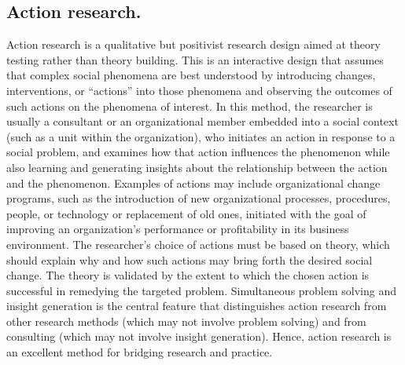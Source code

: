 \subsection{Action research.} Action research is a qualitative but positivist research design aimed at theory testing rather than theory building. This is an interactive design that assumes that complex social phenomena are best understood by introducing changes, interventions, or ``actions'' into those phenomena and observing the outcomes of such actions on the phenomena of interest. In this method, the researcher is usually a consultant or an organizational member embedded into a social context (such as a unit within the organization), who initiates an action in response to a social problem, and examines how that action influences the phenomenon while also learning and generating insights about the relationship between the action and the phenomenon. Examples of actions may include organizational change programs, such as the introduction of new organizational processes, procedures, people, or technology or replacement of old ones, initiated with the goal of improving an organization's performance or profitability in its business environment. The researcher's choice of actions must be based on theory, which should explain why and how such actions may bring forth the desired social change. The theory is validated by the extent to which the chosen action is successful in remedying the targeted problem. Simultaneous problem solving and insight generation is the central feature that distinguishes action research from other research methods (which may not involve problem solving) and from consulting (which may not involve insight generation). Hence, action research is an excellent method for bridging research and practice.

